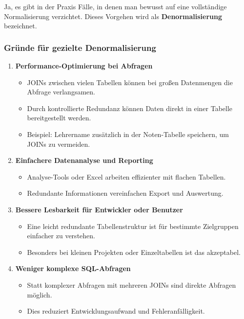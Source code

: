 \documentclass[a4paper,12pt]{article}
\begin{document}
\begin{enumerate}
			Ja, es gibt in der Praxis Fälle, in denen man bewusst auf eine vollständige Normalisierung verzichtet. Dieses Vorgehen wird als \textbf{Denormalisierung} bezeichnet.
			
			\subsubsection*{Gründe für gezielte Denormalisierung}
			
			\begin{enumerate}
				\item \textbf{Performance-Optimierung bei Abfragen}
				\begin{itemize}
					\item JOINs zwischen vielen Tabellen können bei großen Datenmengen die Abfrage verlangsamen.
					\item Durch kontrollierte Redundanz können Daten direkt in einer Tabelle bereitgestellt werden.
					\item Beispiel: Lehrername zusätzlich in der Noten-Tabelle speichern, um JOINs zu vermeiden.
				\end{itemize}
				
				\item \textbf{Einfachere Datenanalyse und Reporting}
				\begin{itemize}
					\item Analyse-Tools oder Excel arbeiten effizienter mit flachen Tabellen.
					\item Redundante Informationen vereinfachen Export und Auswertung.
				\end{itemize}
				
				\item \textbf{Bessere Lesbarkeit für Entwickler oder Benutzer}
				\begin{itemize}
					\item Eine leicht redundante Tabellenstruktur ist für bestimmte Zielgruppen einfacher zu verstehen.
					\item Besonders bei kleinen Projekten oder Einzeltabellen ist das akzeptabel.
				\end{itemize}
				
				\item \textbf{Weniger komplexe SQL-Abfragen}
				\begin{itemize}
					\item Statt komplexer Abfragen mit mehreren JOINs sind direkte Abfragen möglich.
					\item Dies reduziert Entwicklungsaufwand und Fehleranfälligkeit.
				\end{itemize}
				

\end{enumerate}
\end{enumerate}
\end{document}
